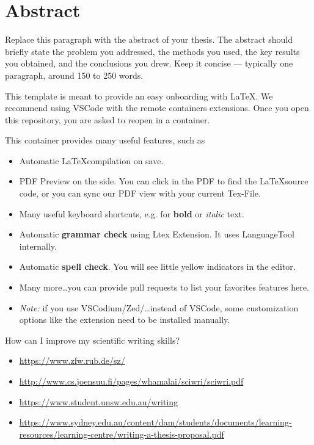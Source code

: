 \section*{Abstract}

Replace this paragraph with the abstract of your thesis. The abstract should briefly state the problem you addressed, the methods you used, the key results you obtained, and the conclusions you drew. Keep it concise — typically one paragraph, around 150 to 250 words.

This template is meant to provide an easy onboarding with \LaTeX.
We recommend using VSCode with the remote containers extensions.
Once you open this repository, you are asked to reopen in a container.

This container provides many useful features, such as
\begin{itemize}
    \item Automatic \LaTeX compilation on save.
    \item PDF Preview on the side. You can click in the PDF to find the \LaTeX source code, or you can sync our PDF view with your current Tex-File.
    \item Many useful keyboard shortcuts, e.g. for \textbf{bold} or \emph{italic} text.
    \item Automatic \textbf{grammar check} using Ltex Extension. It uses LanguageTool internally.
    \item Automatic \textbf{spell check}. You will see little yellow indicators in the editor.
    \item Many more\ldots you can provide pull requests to list your favorites features here.
    \item \emph{Note:} if you use VSCodium/Zed/\ldots instead of VSCode, some customization options like the extension need to be installed manually.
\end{itemize}

How can I improve my scientific writing skills?
\begin{itemize}
 \item \url{https://www.zfw.rub.de/sz/}
 \item \url{http://www.cs.joensuu.fi/pages/whamalai/sciwri/sciwri.pdf}
 \item \url{https://www.student.unsw.edu.au/writing}
 \item \url{https://www.sydney.edu.au/content/dam/students/documents/learning-resources/learning-centre/writing-a-thesis-proposal.pdf}
\end{itemize}